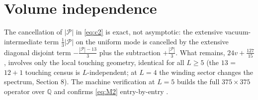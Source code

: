 \documentclass[11pt]{article}
\begin{document}
\section{Volume independence}\label{sec:volume}
The cancellation of $|\mathcal P|$ in \eqref{eq:c2} is exact, not asymptotic:
the extensive vacuum-intermediate term $\frac13|\mathcal P|$ on the uniform
mode is cancelled by the extensive diagonal disjoint term
$-\frac{|\mathcal P|-13}{3}$ plus the subtraction $+\frac{|\mathcal P|}{3}$.
What remains, $24v+\tfrac{127}{15}$, involves only the local touching
geometry, identical for all $L\ge5$ (the $13$ = $12+1$ touching census is
$L$-independent; at $L=4$ the winding sector changes the spectrum, Section 8).
The machine verification at $L=5$ builds the full $375\times375$ operator
over $\mathbb Q$ and confirms \eqref{eq:M2} entry-by-entry
\cite{YM04code}.
\end{document}
